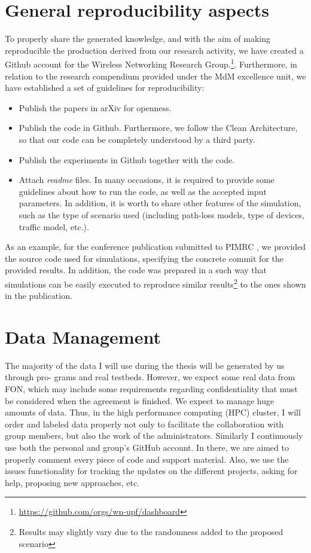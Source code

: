\documentclass[12pt, a4paper,twoside]{article}
\begin{document}
	\section{General reproducibility aspects }
	\label{section:reproducibility}		
	To properly share the generated knowledge, and with the aim of making reproducible the production derived from our research activity, we have created a Github account for the Wireless Networking Research Group.\footnote{\url{https://github.com/orgs/wn-upf/dashboard}}. Furthermore, in relation to the research compendium provided under the MdM excellence unit, we have established a set of guidelines for reproducibility:
	\begin{itemize}
		\item Publish the papers in arXiv for openness.
		\item Publish the code in Github. Furthermore, we follow the Clean Architecture, so that our code can be completely understood by a third party.
		\item Publish the experiments in Github together with the code. 
		\item Attach \textit{readme} files. In many occasions, it is required to provide some guidelines about how to run the code, as well as the accepted input parameters. In addition, it is worth to share other features of the simulation, such as the type of scenario used (including path-loss models, type of devices, traffic model, etc.).
	\end{itemize}				
	As an example, for the conference publication submitted to PIMRC \cite{wilhelmi2017implications}, we provided the source code used for simulations, specifying the concrete commit for the provided results. In addition, the code was prepared in a such way that simulations can be easily executed to reproduce similar results\footnote{Results may slightly vary due to the randomness added to the proposed scenario} to the ones shown in the publication.
	
	\section{Data Management}
	\label{section:data_mgm}	
	The majority of the data I will use during the thesis will be generated by us through pro- grams and real testbeds. However, we expect some real data from FON, which may include some requirements regarding confidentiality that must be considered when the agreement is finished.
	We expect to manage huge amounts of data. Thus, in the high performance computing (HPC) cluster, I will order and labeled data properly not only to facilitate the collaboration with group members, but also the work of the administrators. Similarly I continuously use both the personal and group’s GitHub account. In there, we are aimed to properly comment every piece of code and support material. Also, we use the issues functionality for tracking the updates on the different projects, asking for help, proposing new approaches, etc.
\end{document}
